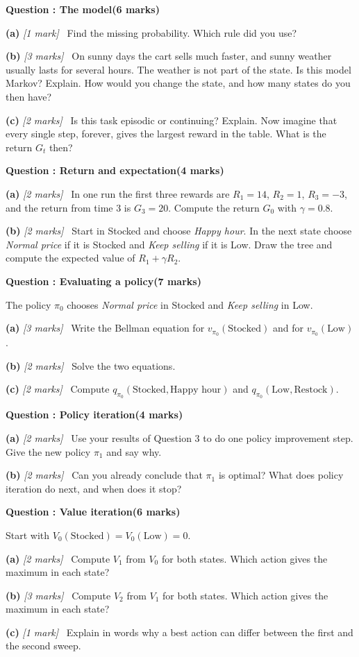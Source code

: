 \documentclass[11pt,a4paper]{article}
\newcounter{qnum}
\newenvironment{examq}[2]{\stepcounter{qnum}\par\noindent\begin{minipage}{\linewidth}\setlength{\parskip}{5pt}%
{\large\bfseries Question \theqnum: #1}\hfill{\bfseries(#2 marks)}\par\smallskip}{\end{minipage}\par\bigskip}
\newcommand{\qpart}[2]{\par\textbf{(#1)} \textit{[#2]}\ }
\begin{document}
\begin{examq}{The model}{6}
\qpart{a}{1 mark} Find the missing probability. Which rule did you use?
\qpart{b}{3 marks} On sunny days the cart sells much faster, and sunny weather usually lasts for several hours.
The weather is not part of the state.
Is this model Markov? Explain. How would you change the state, and how many states do you then have?
\qpart{c}{2 marks} Is this task episodic or continuing? Explain. Now imagine that every single step, forever, gives the largest
reward in the table. What is the return $G_t$ then?
\end{examq}

\begin{examq}{Return and expectation}{4}
\qpart{a}{2 marks} In one run the first three rewards are $R_1=14$, $R_2=1$, $R_3=-3$,
and the return from time 3 is $G_3=20$.
Compute the return $G_0$ with $\gamma=0.8$.
\qpart{b}{2 marks} Start in Stocked and choose \emph{Happy hour}. In the next state choose \emph{Normal price} if it is Stocked and
\emph{Keep selling} if it is Low. Draw the tree and compute the expected value of $R_1+\gamma R_2$.
\end{examq}

\begin{examq}{Evaluating a policy}{7}
The policy $\pi_0$ chooses \emph{Normal price} in Stocked and \emph{Keep selling} in Low.
\qpart{a}{3 marks} Write the Bellman equation for $v_{\pi_0}(\text{Stocked})$ and for $v_{\pi_0}(\text{Low})$.
\qpart{b}{2 marks} Solve the two equations.
\qpart{c}{2 marks} Compute $q_{\pi_0}(\text{Stocked},\text{Happy hour})$ and $q_{\pi_0}(\text{Low},\text{Restock})$.
\end{examq}

\begin{examq}{Policy iteration}{4}
\qpart{a}{2 marks} Use your results of Question 3 to do one policy improvement step. Give the new policy $\pi_1$ and say why.
\qpart{b}{2 marks} Can you already conclude that $\pi_1$ is optimal? What does policy iteration do next, and when does it stop?
\end{examq}

\begin{examq}{Value iteration}{6}
Start with $V_0(\text{Stocked})=V_0(\text{Low})=0$.
\qpart{a}{2 marks} Compute $V_1$ from $V_0$ for both states. Which action gives the maximum in each state?
\qpart{b}{3 marks} Compute $V_2$ from $V_1$ for both states. Which action gives the maximum in each state?
\qpart{c}{1 mark} Explain in words why a best action can differ between the first and the second sweep.
\end{examq}
\end{document}
